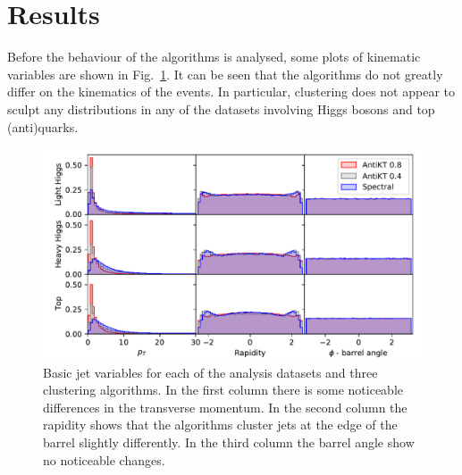 \section{Results}

Before the behaviour of the algorithms is analysed, some plots of kinematic variables are shown
in Fig.~\ref{fig:kinematics}.
It can be seen that the algorithms do not greatly differ on the kinematics of the events.
In particular, \spectral{} clustering does not appear to sculpt any distributions in any of the datasets involving Higgs bosons and top (anti)quarks.


\begin{figure}[htp]
    \begin{center}
    \includegraphics[width=\textwidth]{graphics/kinematics}
        \caption{Basic jet variables for each of the analysis datasets and three clustering algorithms.
            In the first column there is some noticeable differences in the transverse momentum.
            In the second column the rapidity shows that
            the algorithms cluster jets at the edge of the barrel slightly differently.
            In the third column the barrel angle show no noticeable changes.
        }\label{fig:kinematics}
\end{center}
\end{figure}


